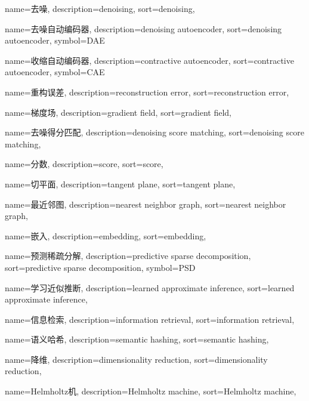 {
  name=去噪,
  description={denoising},
  sort={denoising},
}

{
  name=去噪自动编码器,
  description={denoising autoencoder},
  sort={denoising autoencoder},
  symbol={DAE}
}

{
  name=收缩自动编码器,
  description={contractive autoencoder},
  sort={contractive autoencoder},
  symbol={CAE}
}

{
  name=重构误差,
  description={reconstruction error},
  sort={reconstruction error},
}

{
  name=梯度场,
  description={gradient field},
  sort={gradient field},
}

{
  name=去噪得分匹配,
  description={denoising score matching},
  sort={denoising score matching},
}

{
  name=分数,
  description={score},
  sort={score},
}

{
  name=切平面,
  description={tangent plane},
  sort={tangent plane},
}

{
  name=最近邻图,
  description={nearest neighbor graph},
  sort={nearest neighbor graph},
}

{
  name=嵌入,
  description={embedding},
  sort={embedding},
}

{
  name=预测稀疏分解,
  description={predictive sparse decomposition},
  sort={predictive sparse decomposition},
  symbol={PSD}
}

{
  name=学习近似推断,
  description={learned approximate inference},
  sort={learned approximate inference},
}

{
  name=信息检索,
  description={information retrieval},
  sort={information retrieval},
}

{
  name=语义哈希,
  description={semantic hashing},
  sort={semantic hashing},
}

{
  name=降维,
  description={dimensionality reduction},
  sort={dimensionality reduction},
}

{
  name=Helmholtz机,
  description={Helmholtz machine},
  sort={Helmholtz machine},
}


